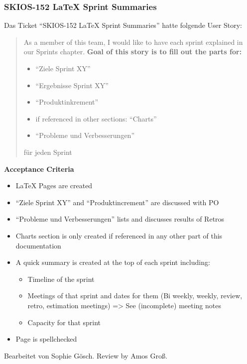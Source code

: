 \subsubsection{SKIOS-152 LaTeX Sprint Summaries}
Das Ticket \enquote{SKIOS-152 LaTeX Sprint Summaries} hatte folgende User Story:
\begin{quotation}
    As a member of this team, I would like to have each sprint explained in our Sprints chapter.
    \textbf{Goal of this story is to fill out the parts for:}
        \begin{itemize}
            \item “Ziele Sprint XY”
            \item “Ergebnisse Sprint XY”
            \item “Produktinkrement”
            \item if referenced in other sections: “Charts”
            \item “Probleme und Verbesserungen”
        \end{itemize}
        für jeden Sprint
\end{quotation}
\textbf{Acceptance Criteria}
    \begin{itemize}
        \item LaTeX Pages are created
        \item “Ziele Sprint XY” and “Produktincrement” are discussed with PO
        \item “Probleme und Verbesserungen” lists and discusses results of Retros
        \item Charts section is only created if referenced in any other part of this documentation
        \item A quick summary is created at the top of each sprint including:
        \begin{itemize}
            \item Timeline of the sprint
            \item Meetings of that sprint and dates for them (Bi weekly, weekly, review, retro, estimation meetings) => See (incomplete) meeting notes
            \item Capacity for that sprint
        \end{itemize}
        \item Page is spellchecked
    \end{itemize}
Bearbeitet von Sophie Gösch.
Review by Amos Groß.

